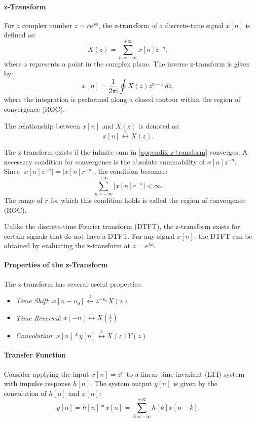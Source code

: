 \paragraph{z-Transform}  
For a complex number \(z = re^{j\phi}\), the z-transform of a discrete-time signal \(x[n]\) is defined as:
\begin{equation}
X(z) = \sum_{n=-\infty}^{+\infty} x[n] z^{-n}, \label{appendix z-transform}
\end{equation}
where \(z\) represents a point in the complex plane. The inverse z-transform is given by:
\[
x[n] = \frac{1}{2\pi \mathrm{i}} \oint X(z) z^{n-1} \, dz,
\]
where the integration is performed along a closed contour within the region of convergence (ROC).  

The relationship between \(x[n]\) and \(X(z)\) is denoted as:
\[
x[n] \overset{z}{\longleftrightarrow} X(z).
\]

The z-transform exists if the infinite sum in \eqref{appendix z-transform} converges. A necessary condition for convergence is the absolute summability of \(x[n]z^{-n}\). Since \(\vert x[n]z^{-n}\vert = \vert x[n]r^{-n} \vert\), the condition becomes:
\[
\sum_{n=-\infty}^{+\infty} \vert x[n] r^{-n} \vert < \infty.
\]
The range of \(r\) for which this condition holds is called the region of convergence (ROC).

Unlike the discrete-time Fourier transform (DTFT), the z-transform exists for certain signals that do not have a DTFT. For any signal \(x[n]\), the DTFT can be obtained by evaluating the z-transform at \(z = e^{j\omega}\).

\paragraph{Properties of the z-Transform}  
The z-transform has several useful properties:
\begin{itemize}
    \item \textit{Time Shift}: \(x[n-n_0] \overset{z}{\longleftrightarrow} z^{-n_0} X(z)\)
    \item \textit{Time Reversal}: \(x[-n] \overset{z}{\longleftrightarrow} X\left(\frac{1}{z}\right)\)
    \item \textit{Convolution}: \(x[n] \ast y[n] \overset{z}{\longleftrightarrow} X(z) Y(z)\)
\end{itemize}

\paragraph{Transfer Function}  
Consider applying the input \(x[n] = z^n\) to a linear time-invariant (LTI) system with impulse response \(h[n]\). The system output \(y[n]\) is given by the convolution of \(h[n]\) and \(x[n]\):
\[
y[n] = h[n] \ast x[n] = \sum_{k=-\infty}^{+\infty} h[k] x[n-k].
\]


